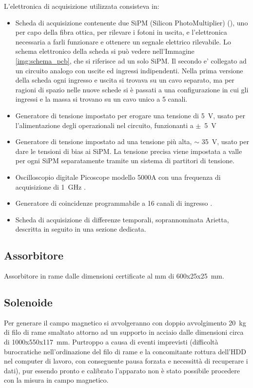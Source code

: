L'elettronica di acquisizione utilizzata consisteva in:
\begin{itemize}
\item Scheda di acquisizione contenente due SiPM (Silicon PhotoMultiplier) (\cite{bib:SiPM}), uno per capo della fibra ottica, per rilevare i fotoni in uscita, e l'elettronica necessaria a farli funzionare e ottenere un segnale elettrico rilevabile. Lo schema elettronico della scheda si pu\`o vedere nell'Immagine \ref{img:schema_pcb}, che si riferisce ad un solo SiPM. Il secondo e' collegato ad un circuito analogo con uscite ed ingressi indipendenti. Nella prima versione della scheda ogni ingresso e uscita si trovava su un cavo separato, ma per ragioni di spazio nelle nuove schede si \`e passati a una configurazione in cui gli ingressi e la massa si trovano su un cavo unico a 5 canali.


\item Generatore di tensione impostato per erogare una tensione di 5~V, usato per l'alimentazione degli operazionali nel circuito, funzionanti a $\pm$~5~V

\item Generatore di tensione impostato ad una tensione pi\`u alta, $\sim$ 35~V, usato per dare le tensioni di bias ai SiPM. La tensione precisa viene impostata a valle per ogni SiPM separatamente tramite un sistema di partitori di tensione.

\item Oscilloscopio digitale Picoscope modello 5000A con una frequenza di acquisizione di 1~GHz \cite{bib:datasheet_pico}.

\item Generatore di coincidenze programmabile a 16 canali di ingresso \cite{bib:articolo_garfa}.

\item Scheda di acquisizione di differenze temporali, soprannominata Arietta, descritta in seguito in una  sezione dedicata.

\end{itemize}

\subsection{Assorbitore}
Assorbitore in rame dalle dimensioni certificate al mm di 600x25x25~mm.

\subsection{Solenoide}
Per generare il campo magnetico si avvolgeranno con doppio avvolgimento 20~kg di filo di rame smaltato attorno ad un supporto in acciaio dalle dimensioni circa
di 1000x550x117~mm.
Purtroppo a causa  di eventi imprevisti (difficolt\`a burocratiche nell'ordinazione del filo di rame e la concomitante rottura dell'HDD nel computer di lavoro, con conseguente pausa forzata e necessitt\`a di recuperare i dati), pur essendo pronto e calibrato l'apparato non \`e stato possibile procedere con la misura in campo magnetico.

